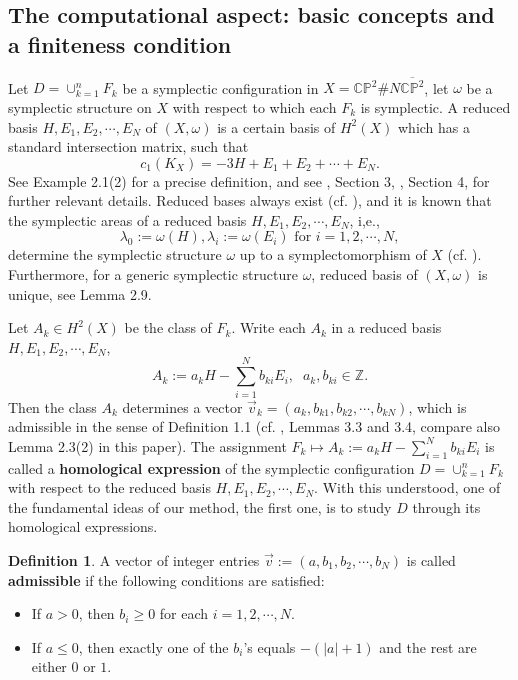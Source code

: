 \documentclass[11pt]{amsart}
\theoremstyle{plain}
\numberwithin{theorem}{section}
\theoremstyle{definition}
\newtheorem{definition}[theorem]{Definition}
\newcommand{\C}{{\mathbb C}}
\newcommand{\Z}{{\mathbb Z}}
\renewcommand{\P}{{\mathbb P}}
\begin{document}
\subsection{The computational aspect: basic concepts and a finiteness condition}
Let $D=\cup_{k=1}^n F_k$ be a symplectic configuration in $X=\C\P^2\# N\overline{\C\P^2}$, let $\omega$ be a symplectic structure on $X$ with respect to which each $F_k$ is symplectic. A reduced basis $H,E_1,E_2,\cdots,E_N$ of $(X,\omega)$ is a certain basis of $H^2(X)$ which has a standard intersection matrix, such that 
$$
c_1(K_X)=-3H+E_1+E_2+\cdots+ E_N.
$$
See Example 2.1(2) for a precise definition, and see \cite{C}, Section 3, \cite{C1}, Section 4, for further relevant details. Reduced bases always exist (cf. \cite{BP, LW}), and it is known that the symplectic areas of a reduced 
basis $H,E_1,E_2,\cdots,E_N$, i,e., 
$$
\lambda_0:=\omega(H), \lambda_i:=\omega(E_i) \mbox{  for } i=1,2,\cdots,N,
$$ 
determine the symplectic structure $\omega$ up to a symplectomorphism of $X$ (cf. \cite{KK}). Furthermore, for a generic symplectic structure $\omega$, reduced basis of $(X,\omega)$ is unique, see Lemma 2.9.

Let $A_k\in H^2(X)$ be the class of $F_k$. Write each $A_k$ in a reduced basis $H,E_1,E_2,\cdots,E_N$, 
$$
A_k:=a_kH-\sum_{i=1}^N b_{ki}E_i, \;\; a_k, b_{ki}\in\Z.
$$
Then the class $A_k$ determines a vector $\vec{v}_k=(a_k, b_{k1}, b_{k2}, \cdots, b_{kN})$, which is admissible in the sense of Definition 1.1 (cf. \cite{C}, Lemmas 3.3 and 3.4, compare also Lemma 2.3(2) in this paper). The assignment $F_k\mapsto A_k:=a_kH-\sum_{i=1}^N b_{ki}E_i$
is called a {\bf homological expression} of the symplectic configuration $D=\cup_{k=1}^nF_k$ with respect to the reduced basis $H,E_1,E_2,\cdots,E_N$. With this understood, one of the fundamental ideas of our method, the first one, is to study $D$ through its homological expressions. 

\begin{definition}
A vector of integer entries $\vec{v}:=(a, b_{1}, b_{2}, \cdots, b_{N})$ is called {\bf admissible} if the following conditions are satisfied: 
\begin{itemize}
\item [{(1)}] If $a>0$, then $b_i\geq 0$ for each $i=1,2,\cdots,N$.
\item [{(2)}] If $a\leq 0$, then exactly one of the $b_i$'s equals $-(|a|+1)$ and the rest are either $0$ or $1$.
\end{itemize}
\end{definition}
\end{document}

